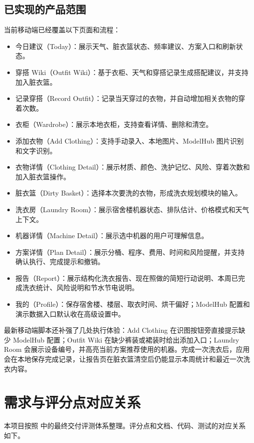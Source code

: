 \documentclass[11pt,a4paper]{ctexart}
\begin{document}
\subsection{已实现的产品范围}

当前移动端已经覆盖以下页面和流程：

\begin{itemize}
  \item 今日建议（Today）：展示天气、脏衣篮状态、频率建议、方案入口和刷新状态。
  \item 穿搭 Wiki（Outfit Wiki）：基于衣柜、天气和穿搭记录生成搭配建议，并支持加入脏衣篮。
  \item 记录穿搭（Record Outfit）：记录当天穿过的衣物，并自动增加相关衣物的穿着次数。
  \item 衣柜（Wardrobe）：展示本地衣柜，支持查看详情、删除和清空。
  \item 添加衣物（Add Clothing）：支持手动录入、本地图片、ModelHub 图片识别和文字识别。
  \item 衣物详情（Clothing Detail）：展示材质、颜色、洗护记忆、风险、穿着次数和加入脏衣篮操作。
  \item 脏衣篮（Dirty Basket）：选择本次要洗的衣物，形成洗衣规划模块的输入。
  \item 洗衣房（Laundry Room）：展示宿舍楼机器状态、排队估计、价格模式和天气上下文。
  \item 机器详情（Machine Detail）：展示选中机器的用户可理解信息。
  \item 方案详情（Plan Detail）：展示分桶、程序、费用、时间和风险提醒，并支持确认执行、完成提示和撤销。
  \item 报告（Report）：展示结构化洗衣报告、现在照做的简短行动说明、本周已完成洗衣统计、风险说明和节水节电说明。
  \item 我的（Profile）：保存宿舍楼、楼层、取衣时间、烘干偏好；ModelHub 配置和演示数据入口默认收在高级设置中。
\end{itemize}

最新移动端脚本还补强了几处执行体验：Add Clothing 在识图按钮旁直接提示缺少 ModelHub 配置；Outfit Wiki 在缺少裤装或裙装时给出添加入口；Laundry Room 会展示设备编号，并高亮当前方案推荐使用的机器。完成一次洗衣后，应用会在本地保存完成记录，让报告页在脏衣篮清空后仍能显示本周统计和最近一次洗衣内容。

\section{需求与评分点对应关系}

本项目按照  中的最终交付评测体系整理。评分点和文档、代码、测试的对应关系如下。
\end{document}
